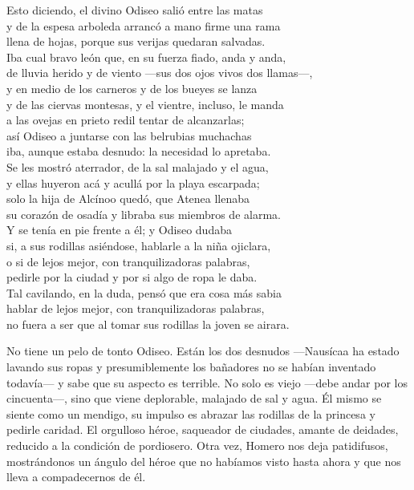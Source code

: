\begin{versocita}
Esto diciendo, el divino Odiseo salió entre las matas\\
y de la espesa arboleda arrancó a mano firme una rama\\
llena de hojas, porque sus verijas quedaran salvadas.\\
Iba cual bravo león que, en su fuerza fiado, anda y anda,\\
de lluvia herido y de viento ---sus dos ojos vivos dos llamas---,\\
y en medio de los carneros y de los bueyes se lanza\\
y de las ciervas montesas, y el vientre, incluso, le manda\\
a las ovejas en prieto redil tentar de alcanzarlas;\\
así Odiseo a juntarse con las belrubias muchachas\\
iba, aunque estaba desnudo: la necesidad lo apretaba.\\
Se les mostró aterrador, de la sal malajado y el agua,\\
y ellas huyeron acá y acullá por la playa escarpada;\\
solo la hija de Alcínoo quedó, que Atenea llenaba\\
su corazón de osadía y libraba sus miembros de alarma.\\
Y se tenía en pie frente a él; y Odiseo dudaba\\
si, a sus rodillas asiéndose, hablarle a la niña ojiclara,\\
o si de lejos mejor, con tranquilizadoras palabras,\\
pedirle por la ciudad y por si algo de ropa le daba.\\
Tal cavilando, en la duda, pensó que era cosa más sabia\\
hablar de lejos mejor, con tranquilizadoras palabras,\\
no fuera a ser que al tomar sus rodillas la joven se airara.
\end{versocita}

No tiene un pelo de tonto Odiseo. Están los dos desnudos ---Nausícaa ha estado lavando sus ropas y presumiblemente los bañadores no se habían inventado todavía--- y sabe que su aspecto es terrible. No solo es viejo ---debe andar por los cincuenta---, sino que viene deplorable, malajado de sal y agua. Él mismo se siente como un mendigo, su impulso es abrazar las rodillas de la princesa y pedirle caridad. El orgulloso héroe, saqueador de ciudades, amante de deidades, reducido a la condición de pordiosero. Otra vez, Homero nos deja patidifusos, mostrándonos un ángulo del héroe que no habíamos visto hasta ahora y que nos lleva a compadecernos de él.

